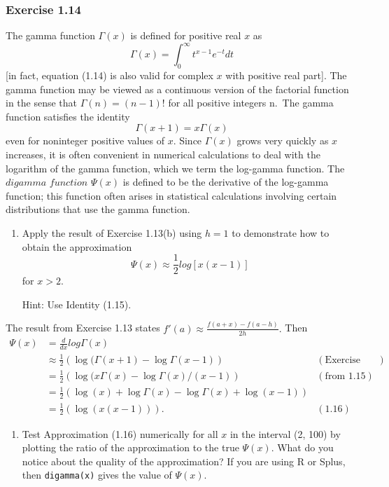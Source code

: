 \documentclass[12pt,]{article}
\providecommand{\tightlist}{%
  \setlength{\itemsep}{0pt}\setlength{\parskip}{0pt}}
\begin{document}
\hypertarget{exercise-1.14}{%
\subsubsection{Exercise 1.14}\label{exercise-1.14}}

The gamma function \(\Gamma(x)\) is defined for positive real \(x\) as
\[\Gamma(x) = \int_0^\infty t^{x-1}e^{-t}dt\] {[}in fact, equation
(1.14) is also valid for complex \(x\) with positive real part{]}. The
gamma function may be viewed as a continuous version of the factorial
function in the sense that \(\Gamma(n) = (n-1)!\) for all positive
integers n.~The gamma function satisfies the identity
\[\Gamma(x+1) = x\Gamma(x)\] even for noninteger positive values of
\(x\). Since \(\Gamma (x)\) grows very quickly as \(x\) increases, it is
often convenient in numerical calculations to deal with the logarithm of
the gamma function, which we term the log-gamma function. The
\(\textit{digamma function}\) \(\Psi(x)\) is defined to be the
derivative of the log-gamma function; this function often arises in
statistical calculations involving certain distributions that use the
gamma function.

\begin{enumerate}
\def\labelenumi{\alph{enumi}.}
\item
  Apply the result of Exercise 1.13(b) using \(h = 1\) to demonstrate
  how to obtain the approximation
  \[\Psi(x) \approx \frac{1}{2} log[x(x-1)]\] for \(x>2.\)

  Hint: Use Identity (1.15).
\end{enumerate}

The result from Exercise 1.13 states
\(f'(a) \approx \frac{f(a+x) - f(a-h)}{2h}.\) Then \begin{align*}
\Psi (x) &= \frac{d}{dx} log \Gamma (x)\\
& \approx \frac{1}{2} \left(\log(\Gamma(x+1) - \log\Gamma(x-1)\right) & (\text{Exercise 1.13(b)})\\
& = \frac{1}{2} \left(\log(x\Gamma(x) - \log\Gamma(x)/(x-1)\right) & (\text{from 1.15})\\
& = \frac{1}{2} \left(\log(x) + \log \Gamma (x) - \log\Gamma(x) + \log(x-1)\right)\\
& = \frac{1}{2} \left(\log(x(x-1))\right). & (1.16)
\end{align*}

\begin{enumerate}
\def\labelenumi{\alph{enumi}.}
\setcounter{enumi}{1}
\tightlist
\item
  Test Approximation (1.16) numerically for all \(x\) in the interval
  (2, 100) by plotting the ratio of the approximation to the true
  \(\Psi(x)\). What do you notice about the quality of the
  approximation? If you are using R or Splus, then \texttt{digamma(x)}
  gives the value of \(\Psi(x)\).
\end{enumerate}
\end{document}
